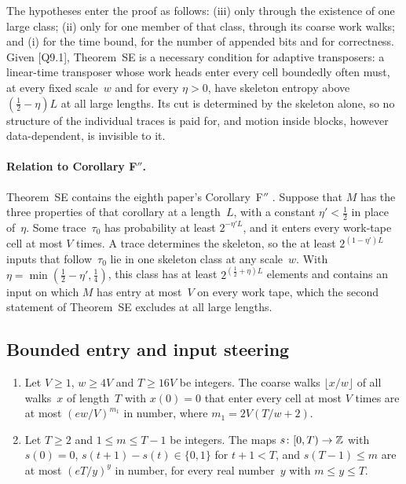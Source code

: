 The hypotheses enter the proof as follows: (iii) only through the existence of one large class; (ii) only for one member
of that class, through its coarse work walks; and (i) for the time bound, for the number of appended bits and for
correctness. Given [Q9.1], Theorem~SE is a necessary condition for adaptive transposers: a linear-time transposer whose
work heads enter every cell boundedly often must, at every fixed scale~$w$ and for every $\eta>0$, have skeleton entropy
above $(\frac12-\eta)L$ at all large lengths. Its cut is determined by the skeleton alone, so no structure of the
individual traces is paid for, and motion inside blocks, however data-dependent, is invisible to it.

\paragraph{Relation to Corollary F$''$.} Theorem~SE contains the eighth paper's Corollary~F$''$
\cite[Corollary~6.4]{BoundedNesting2026}. Suppose that $M$ has the three properties of that corollary at a length~$L$,
with a constant $\eta'<\frac12$ in place of~$\eta$. Some trace~$\tau_0$ has probability at least $2^{-\eta'L}$, and it
enters every work-tape cell at most $V$ times. A trace determines the skeleton, so the at least $2^{(1-\eta')L}$ inputs
that follow~$\tau_0$ lie in one skeleton class at any scale~$w$. With $\eta=\min(\frac12-\eta',\frac14)$, this class has
at least $2^{(\frac12+\eta)L}$ elements and contains an input on which $M$ has entry at most~$V$ on every work tape,
which the second statement of Theorem~SE excludes at all large lengths.

\subsection{Bounded entry and input steering}\label{sec:skel-steering}

\begin{lemma}\label{lem:skeleton-count}
\begin{enumerate}[label=(\alph*)]
\item Let $V\ge1$, $w\ge4V$ and $T\ge16V$ be integers. The coarse walks $\lfloor x/w\rfloor$ of all walks~$x$ of
length~$T$ with $x(0)=0$ that enter every cell at most $V$ times are at most $(ew/V)^{m_1}$ in number, where
$m_1=2V(T/w+2)$.
\item Let $T\ge2$ and $1\le m\le T-1$ be integers. The maps $s\colon[0,T)\to\mathbb{Z}$ with $s(0)=0$, $s(t+1)-s(t)\in\{0,1\}$
for $t+1<T$, and $s(T-1)\le m$ are at most $(eT/y)^y$ in number, for every real number~$y$ with $m\le y\le T$.
\end{enumerate}
\end{lemma}

